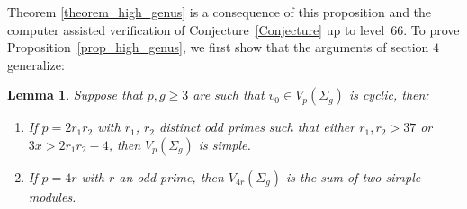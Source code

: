 \documentclass[pdftex]{sigma}
\numberwithin{equation}{section}
\newtheorem{Lemma}[Theorem]{Lemma}
\begin{document}
Theorem \ref{theorem_high_genus} is a consequence of this proposition and the computer assisted verification of Conjecture~\ref{Conjecture} up to level~$66$. To prove Proposition~\ref{prop_high_genus}, we first show that the arguments of section $4$ generalize:
\begin{Lemma}\label{lemma_highgen1}
Suppose that $p, g \geq 3$ are such that $v_0\in V_p(\Sigma_g)$ is cyclic, then:
\begin{enumerate}\itemsep=0pt
\item[$1.$] If $p=2r_1r_2$ with $r_1$, $r_2$ distinct odd primes such that either $r_1,r_2>37$ or $3x>2r_1r_2-4$, then $V_p(\Sigma_g)$ is simple.
\item[$2.$] If $p=4r$ with $r$ an odd prime, then $V_{4r}(\Sigma_g)$ is the sum of two simple modules.
\end{enumerate}
\end{Lemma}
\end{document}
